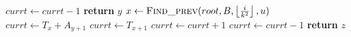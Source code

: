 \documentclass{article}
\begin{document}
    \begin{algorithm}[ht]
    \begin{algorithmic}[1]
                        \State $currt\gets currt-1$
                    \EndIf
                        \State \textbf{return} $y$
                    \EndIf
                \EndFor
            \EndIf
        \EndFor
        \State
        \State $x\gets \Call{Find\_prev}{root,B,\left\lfloor{\frac{i}{k^2}}\right\rfloor,u}$ 
                    \State $currt\gets T_x+A_{y+1}$
                \Else
                    \State $currt\gets T_{x+1}$
                \EndIf
                        \State $currt\gets currt+1$
                    \EndIf
                        \State $currt\gets currt-1$
                    \EndIf
                        \State \textbf{return} $z$
                    \EndIf
                \EndFor
            \EndIf
        \EndFor
    \EndProcedure
    \end{algorithmic}
    \end{algorithm}
\end{document}
